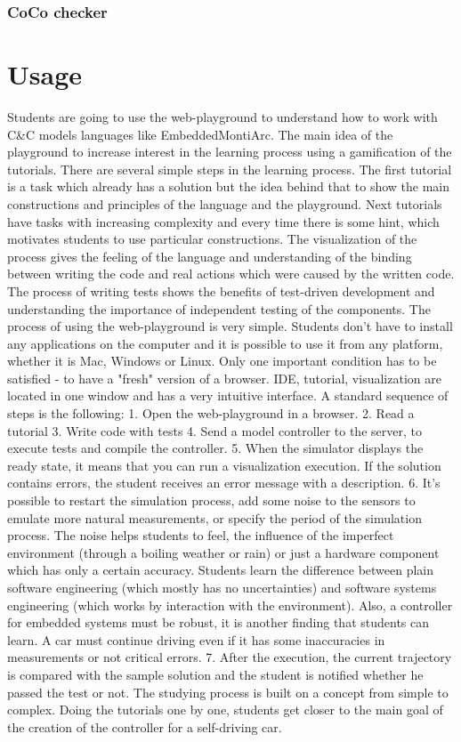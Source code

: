 \subsection{CoCo checker}
\chapter{Usage}
Students are going to use the web-playground to understand how to work with C\&C models languages like EmbeddedMontiArc. The main idea of the playground to increase interest in the learning process using a gamification of the tutorials. There are several simple steps in the learning process. The first tutorial is a task which already has a solution but the idea behind that to show the main constructions and principles of the language and the playground. Next tutorials have tasks with increasing complexity and every time there is some hint, which motivates students to use particular constructions. The visualization of the process gives the feeling of the language and understanding of the binding between writing the code and real actions which were caused by the written code. The process of writing tests shows the benefits of test-driven development and understanding the importance of independent testing of the components.
The process of using the web-playground is very simple. Students don't have to install any applications on the computer and it is possible to use it from any platform, whether it is Mac, Windows or Linux. Only one important condition has to be satisfied - to have a "fresh" version of a browser. IDE, tutorial, visualization are located in one window and has a very intuitive interface.
A standard sequence of steps is the following:
1. Open the web-playground in a browser.
2. Read a tutorial
3. Write code with tests
4. Send a model controller to the server, to execute tests and compile the controller.
5. When the simulator displays the ready state, it means that you can run a visualization execution. If the solution contains errors, the student receives an error message with a description.
6. It's possible to restart the simulation process, add some noise to the sensors to emulate more natural measurements, or specify the period of the simulation process. The noise helps students to feel, the influence of the imperfect environment (through a boiling weather or rain) or just a hardware component which has only a certain accuracy. Students learn the difference between plain software engineering (which mostly has no uncertainties) and software systems engineering (which works by interaction with the environment). Also, a controller for embedded systems must be robust, it is another finding that students can learn. A car must continue driving even if it has some inaccuracies in measurements or not critical errors.
7. After the execution, the current trajectory is compared with the sample solution and the student is notified whether he passed the test or not.
The studying process is built on a concept from simple to complex. Doing the tutorials one by one, students get closer to the main goal of the creation of the controller for a self-driving car.